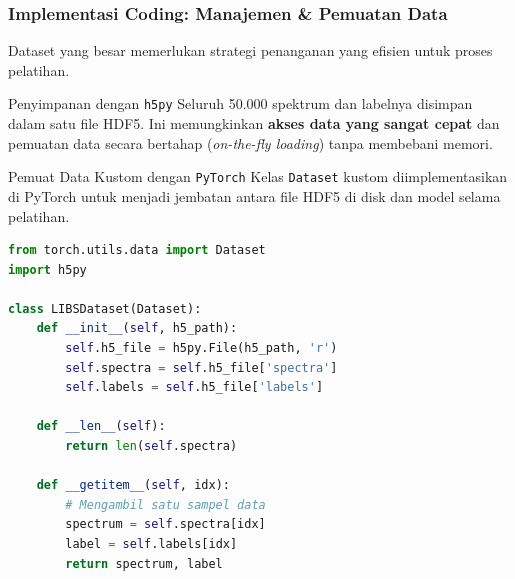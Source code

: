 \documentclass{beamer}
\begin{document}
\begin{frame}
  \frametitle{Implementasi Coding: Manajemen \& Pemuatan Data}
  
  Dataset yang besar memerlukan strategi penanganan yang efisien untuk proses pelatihan.
  
  \begin{block}{Penyimpanan dengan \texttt{h5py}}
  Seluruh 50.000 spektrum dan labelnya disimpan dalam satu file HDF5. Ini memungkinkan \textbf{akses data yang sangat cepat} dan pemuatan data secara bertahap (\textit{on-the-fly loading}) tanpa membebani memori.
  \end{block}
  
  \begin{block}{Pemuat Data Kustom dengan \texttt{PyTorch}}
  Kelas \texttt{Dataset} kustom diimplementasikan di PyTorch untuk menjadi jembatan antara file HDF5 di disk dan model selama pelatihan.
  \begin{lstlisting}[language=Python]
from torch.utils.data import Dataset
import h5py

class LIBSDataset(Dataset):
    def __init__(self, h5_path):
        self.h5_file = h5py.File(h5_path, 'r')
        self.spectra = self.h5_file['spectra']
        self.labels = self.h5_file['labels']

    def __len__(self):
        return len(self.spectra)

    def __getitem__(self, idx):
        # Mengambil satu sampel data
        spectrum = self.spectra[idx]
        label = self.labels[idx]
        return spectrum, label
  \end{lstlisting}
  \end{block}
\end{frame}
\end{document}
